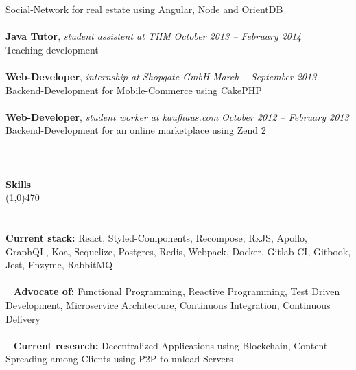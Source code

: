 \documentclass[10pt]{article} %
\begin{document}
Social-Network for real estate using Angular, Node and OrientDB\\\\
\noindent
{\bf Java Tutor}, \textit{student assistent at THM}  \hfill \textit{ October 2013 -- February 2014 } \\ 
Teaching development\\\\
\noindent
{\bf Web-Developer}, \textit{internship at Shopgate GmbH}  \hfill \textit{ March -- September 2013 } \\ 
Backend-Development for Mobile-Commerce using CakePHP\\\\
\noindent
{\bf Web-Developer}, \textit{student worker at kaufhaus.com}  \hfill \textit{ October 2012 -- February 2013 } \\ 
Backend-Development for an online marketplace using Zend 2\\\\
\noindent
\\\\
{\Large \bf Skills}\\
\line(1,0){470}\\
\\\\
\noindent
{\bf Current stack:} React, Styled-Components, Recompose, RxJS, Apollo, GraphQL, Koa, Sequelize, Postgres, Redis, Webpack, Docker, Gitlab CI, Gitbook, Jest, Enzyme, RabbitMQ \\\\\
\noindent
{\bf Advocate of:} Functional Programming, Reactive Programming, Test Driven Development, Microservice Architecture, Continuous Integration, Continuous Delivery \\\\\
\noindent
{\bf Current research:} Decentralized Applications using Blockchain, Content-Spreading among Clients using P2P to unload Servers \\\\\
\end{document}
